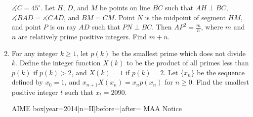 \documentclass{article}
\begin{document}
\begin{enumerate}[label=\arabic*., itemsep=0.5em]
\(\measuredangle C=45^{\circ}\). Let \(H\), \(D\), and \(M\) be points on line \(\overline{BC}\) such that \(AH\perp BC\), \(\measuredangle BAD=\measuredangle CAD\), and \(BM=CM\). Point \(N\) is the midpoint of segment \(HM\), and point \(P\) is on ray \(AD\) such that \(PN\perp BC\). Then \(AP^2=\frac{m}{n}\), where \(m\) and \(n\) are relatively prime positive integers. Find \(m+n\).\par \vspace{0.5em}\item For any integer \(k\geq 1\), let \(p(k)\) be the smallest prime which does not divide \(k\). Define the integer function \(X(k)\) to be the product of all primes less than \(p(k)\) if \(p(k)>2\), and \(X(k)=1\) if \(p(k)=2\). Let \(\{x_n\}\) be the sequence defined by \(x_0=1\), and \(x_{n+1}X(x_n)=x_np(x_n)\) for \(n\geq 0\). Find the smallest positive integer \(t\) such that \(x_t=2090\). 



{{AIME box|year=2014|n=II|before=|after=}}
{{MAA Notice}}\par \vspace{0.5em}\end{enumerate}
\end{document}
